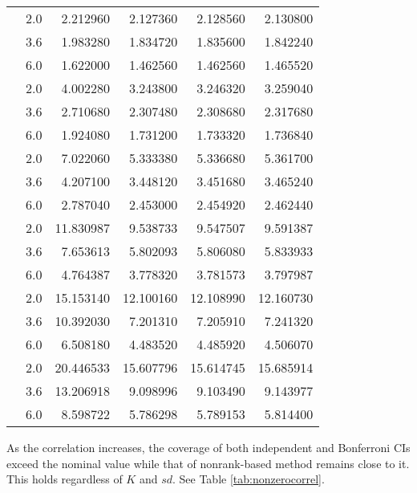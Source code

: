 \documentclass[
  12pt,
  a4paper,
]{article}
\numberwithin{equation}{section}
\begin{document}
\begin{longtable}[t]{rrrrrr}
\endfoot
\bottomrule
\endlastfoot
 & 2.0 & 2.212960 & 2.127360 & 2.128560 & 2.130800\\
\nopagebreak
 & 3.6 & 1.983280 & 1.834720 & 1.835600 & 1.842240\\
\nopagebreak
\multirow{-3}{*}{\raggedleft\arraybackslash 5} & 6.0 & 1.622000 & 1.462560 & 1.462560 & 1.465520\\
\cmidrule{1-6}\pagebreak[0]
 & 2.0 & 4.002280 & 3.243800 & 3.246320 & 3.259040\\
\nopagebreak
 & 3.6 & 2.710680 & 2.307480 & 2.308680 & 2.317680\\
\nopagebreak
\multirow{-3}{*}{\raggedleft\arraybackslash 10} & 6.0 & 1.924080 & 1.731200 & 1.733320 & 1.736840\\
\cmidrule{1-6}\pagebreak[0]
 & 2.0 & 7.022060 & 5.333380 & 5.336680 & 5.361700\\
\nopagebreak
 & 3.6 & 4.207100 & 3.448120 & 3.451680 & 3.465240\\
\nopagebreak
\multirow{-3}{*}{\raggedleft\arraybackslash 20} & 6.0 & 2.787040 & 2.453000 & 2.454920 & 2.462440\\
\cmidrule{1-6}\pagebreak[0]
 & 2.0 & 11.830987 & 9.538733 & 9.547507 & 9.591387\\
\nopagebreak
 & 3.6 & 7.653613 & 5.802093 & 5.806080 & 5.833933\\
\nopagebreak
\multirow{-3}{*}{\raggedleft\arraybackslash 30} & 6.0 & 4.764387 & 3.778320 & 3.781573 & 3.797987\\
\cmidrule{1-6}\pagebreak[0]
 & 2.0 & 15.153140 & 12.100160 & 12.108990 & 12.160730\\
\nopagebreak
 & 3.6 & 10.392030 & 7.201310 & 7.205910 & 7.241320\\
\nopagebreak
\multirow{-3}{*}{\raggedleft\arraybackslash 40} & 6.0 & 6.508180 & 4.483520 & 4.485920 & 4.506070\\
\cmidrule{1-6}\pagebreak[0]
 & 2.0 & 20.446533 & 15.607796 & 15.614745 & 15.685914\\
\nopagebreak
 & 3.6 & 13.206918 & 9.098996 & 9.103490 & 9.143977\\
\nopagebreak
\multirow{-3}{*}{\raggedleft\arraybackslash 51} & 6.0 & 8.598722 & 5.786298 & 5.789153 & 5.814400\\*
\end{longtable}

As the correlation increases, the coverage of both independent and Bonferroni CIs exceed the nominal value while that of nonrank-based method remains close to it. This holds regardless of \(K\) and \(sd\). See Table \ref{tab:nonzerocorrel}.
\end{document}
